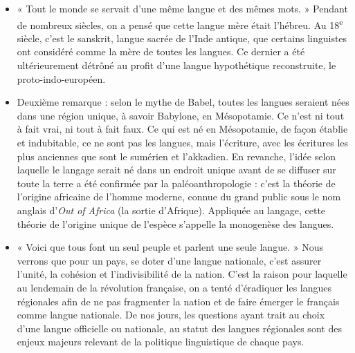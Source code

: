 \begin{itemize}
\item « Tout le monde se servait d’une même langue et des mêmes mots. » Pendant de nombreux siècles, on a pensé que cette langue mère était l’hébreu. Au 18\textsuperscript{e} siècle, c’est le sanskrit, langue sacrée de l’Inde antique, que certains linguistes ont considéré comme la mère de toutes les langues. Ce dernier a été ultérieurement détrôné au profit d’une langue hypothétique reconstruite, le proto-indo-européen.
\item Deuxième remarque : selon le mythe de Babel, toutes les langues seraient nées dans une région unique, à savoir Babylone, en Mésopotamie. Ce n’est ni tout à fait vrai, ni tout à fait faux. Ce qui est né en Mésopotamie, de façon établie et indubitable, ce ne sont pas les langues, mais l’écriture, avec les écritures les plus anciennes que sont le sumérien et l’akkadien. En revanche, l’idée selon laquelle le langage serait né dans un endroit unique avant de se diffuser sur toute la terre a été confirmée par la paléoanthropologie : c’est la théorie de l’origine africaine de l’homme moderne, connue du grand public sous le nom anglais d’\textit{Out of Africa} (la sortie d’Afrique). Appliquée au langage, cette théorie de l’origine unique de l’espèce s’appelle la monogenèse des langues.
\end{itemize}
\begin{itemize}
\item « Voici que tous font un seul peuple et parlent une seule langue. » Nous verrons que pour un pays, se doter d’une langue nationale, c’est assurer l’unité, la cohésion et l’indivisibilité de la nation. C’est la raison pour laquelle au lendemain de la révolution française, on a tenté d’éradiquer les langues régionales afin de ne pas fragmenter la nation et de faire émerger le français comme langue nationale. De nos jours, les questions ayant trait au choix d’une langue officielle ou nationale, au statut des langues régionales sont des enjeux majeurs relevant de la politique linguistique de chaque pays.
\end{itemize}
